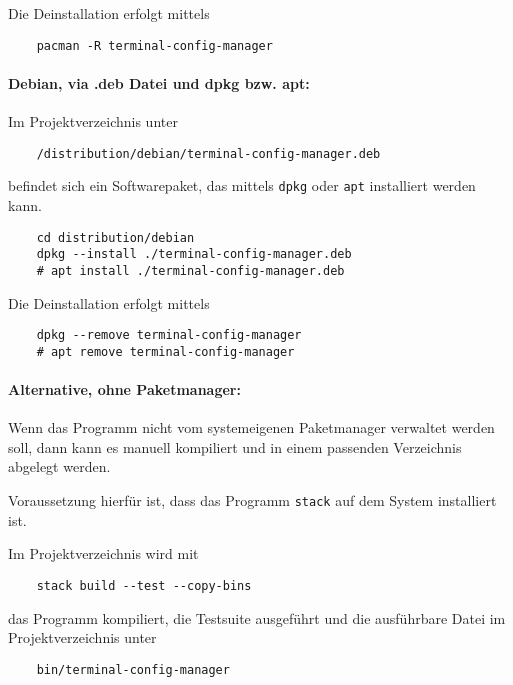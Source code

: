 \documentclass[a4paper,11pt]{scrartcl} %
\begin{document}
Die Deinstallation erfolgt mittels

\begin{verbatim}
	pacman -R terminal-config-manager
\end{verbatim}

\paragraph{Debian, via .deb Datei und dpkg bzw. apt:}
Im Projektverzeichnis unter

\begin{verbatim}
	/distribution/debian/terminal-config-manager.deb
\end{verbatim}

befindet sich ein Softwarepaket, das mittels \texttt{dpkg} oder
\texttt{apt} installiert werden kann.

\begin{verbatim}
	cd distribution/debian
	dpkg --install ./terminal-config-manager.deb
	# apt install ./terminal-config-manager.deb
\end{verbatim}

Die Deinstallation erfolgt mittels

\begin{verbatim}
	dpkg --remove terminal-config-manager
	# apt remove terminal-config-manager
\end{verbatim}

\paragraph{Alternative, ohne Paketmanager:}
Wenn das Programm nicht vom systemeigenen Paketmanager verwaltet werden
soll, dann kann es manuell kompiliert und in einem passenden
Verzeichnis abgelegt werden.

Voraussetzung hierfür ist, dass das Programm \texttt{stack} auf dem
System installiert ist.

Im Projektverzeichnis wird mit

\begin{verbatim}
	stack build --test --copy-bins
\end{verbatim}

das Programm kompiliert, die Testsuite ausgeführt und die ausführbare Datei im
Projektverzeichnis unter

\begin{verbatim}
	bin/terminal-config-manager
\end{verbatim}
\end{document}
